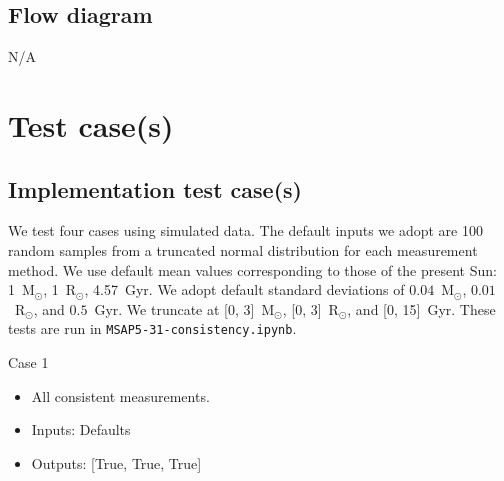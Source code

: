 \documentclass[a4paper, oneside, 11pt, article, english]{memoir}
\begin{document}
\section{Flow diagram}
\label{sec:flowchart}

N/A



\clearpage
\chapter{Test case(s)}
\label{chap:tests}


\section{Implementation test case(s)}
\label{sec:test-implement}


{
  \itshape

}

We test four cases using simulated data. The default inputs we adopt are 100 random samples from a truncated normal distribution for each measurement method. We use default mean values corresponding to those of the present Sun: 1~M$_\odot$, 1~R$_\odot$, 4.57~Gyr. We adopt default standard deviations of $0.04$~M$_\odot$, $0.01$~R$_\odot$, and $0.5$~Gyr. We truncate at [0, 3]~M$_\odot$, [0, 3]~R$_\odot$, and [0, 15]~Gyr. These tests are run in \texttt{MSAP5-31-consistency.ipynb}. 

Case 1
  \begin{itemize}
      \firmlist
      \item All consistent measurements. 
      \item Inputs: Defaults
      \item Outputs: [True, True, True]
  \end{itemize}
\end{document}
